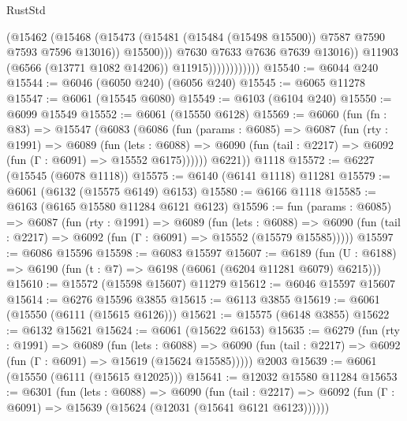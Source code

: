 \begin{lexlean}{RustStd}
\begin{coremodule}
                                  (@15462
                                    (@15468
                                      (@15473
                                        (@15481
                                          (@15484 (@15498 @15500))
                                          @7587
                                          @7590
                                          @7593
                                          @7596
                                          @13016))
                                      @15500)))
                                @7630
                                @7633
                                @7636
                                @7639
                                @13016))
                            @11903
                            (@6566 (@13771 @1082 @14206))
                            @11915))))))))))))
@15540 := @6044 @240
@15544 := @6046 (@6050 @240) (@6056 @240)
@15545 := @6065 @11278
@15547 := @6061 (@15545 @6080)
@15549 := @6103 (@6104 @240)
@15550 := @6099 @15549
@15552 := @6061 (@15550 @6128)
@15569 := @6060
    (fun (fn : @83) =>
    @15547
      (@6083
        (@6086
          (fun (params : @6085) =>
          @6087
            (fun (rty : @1991) =>
            @6089
              (fun (lets : @6088) =>
              @6090 (fun (tail : @2217) => @6092 (fun (Γ : @6091) => @15552 @6175))))))
        @6221))
    @1118
@15572 := @6227 (@15545 (@6078 @1118))
@15575 := @6140 (@6141 @1118) @11281
@15579 := @6061 (@6132 (@15575 @6149) @6153)
@15580 := @6166 @1118
@15585 := @6163 (@6165 @15580 @11284 @6121 @6123)
@15596 := fun (params : @6085) =>
  @6087
    (fun (rty : @1991) =>
    @6089
      (fun (lets : @6088) =>
      @6090 (fun (tail : @2217) => @6092 (fun (Γ : @6091) => @15552 (@15579 @15585)))))
@15597 := @6086 @15596
@15598 := @6083 @15597
@15607 := @6189
    (fun (U : @6188) => @6190 (fun (t : @7) => @6198 (@6061 (@6204 @11281 @6079) @6215)))
@15610 := @15572 (@15598 @15607) @11279
@15612 := @6046 @15597 @15607
@15614 := @6276 @15596 @3855
@15615 := @6113 @3855
@15619 := @6061 (@15550 (@6111 (@15615 @6126)))
@15621 := @15575 (@6148 @3855)
@15622 := @6132 @15621
@15624 := @6061 (@15622 @6153)
@15635 := @6279
    (fun (rty : @1991) =>
    @6089
      (fun (lets : @6088) =>
      @6090 (fun (tail : @2217) => @6092 (fun (Γ : @6091) => @15619 (@15624 @15585)))))
    @2003
@15639 := @6061 (@15550 (@6111 (@15615 @12025)))
@15641 := @12032 @15580 @11284
@15653 := @6301
    (fun (lets : @6088) =>
    @6090
      (fun (tail : @2217) =>
      @6092 (fun (Γ : @6091) => @15639 (@15624 (@12031 (@15641 @6121 @6123))))))

\end{coremodule}
\end{lexlean}

